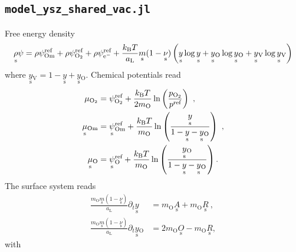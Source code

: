 \documentclass{article}
\numberwithin{equation}{section}
\newcommand{\us}[1]{\underset{\textrm{s}}{#1}{}}
\def\kB{k_\mathrm{B}}
\def\Ox{\mathrm{O}}
\def\Om{\mathrm{Om}}
\newcommand{\OO}{{\ce{O2}}}
\def\eM{\mathrm{e^-}}
\def\aL{a_\mathrm{L}}
\def\ys{\us y}
\newcommand{\ysV}{\us y_{\textrm{V}}}
\def\yOs{\us y_\textrm{O}}
\def\REF{\textrm{ref}}
\begin{document}
\subsection{\texttt{model\_ysz\_shared\_vac.jl}}
Free energy density
\begin{align}
    \us\rho\psi = 
              \rho\psi^\REF_\Om
            + \rho\psi^\REF_\OO
            + \rho\psi^\REF_\eM
            + \frac{\kB T}{\aL}\us m(1-\us\nu) 
            \left( 
                \ys   \log {\ys} 
                +\yOs  \log {\yOs}
                +\ysV  \log {\ysV}
            \right)
    \label{}
\end{align}
where $\ysV = 1 - \ys + \yOs$.
Chemical potentials read
\begin{subequations}
\begin{align}
\mu_{\OO} &= \psi_{\OO}^\REF + \frac{\kB T}{2 m_\Ox}\ln 
\left( 
    \frac{p_\OO}{p^\REF} 
\right)~,
\\
\us\mu_{\Om} 
&= 
\us \psi_{\Om}^\REF 
+ 
\frac{\kB T}{m_\Ox} \ln 
\left(  
	\frac{\ys}{1-\ys - \yOs}
\right)~,
\\
\us\mu_{\Ox} 
&= 
\us \psi_{\Ox}^\REF 
+ 
\frac{\kB T}{m_\Ox} \ln 
\left(  
	\frac{\yOs}{1-\ys - \yOs}
\right).
\end{align}
\end{subequations}
The surface system reads
\begin{subequations}
\begin{align}
 \frac{m_\Ox \us m (1- \us \nu)}{\aL}\partial_t \ys
&=
m_\Ox \us A
+
m_\Ox \us R~,
\\
 \frac{m_\Ox \us m (1- \us \nu)}{\aL}\partial_t \yOs
&=
2 m_\Ox \us O
-
m_\Ox \us R,
\end{align}
\end{subequations}
with
\end{document}

